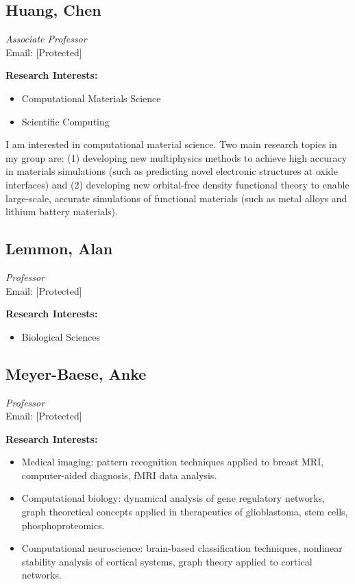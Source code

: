\documentclass[12pt,a4paper]{article}
\begin{document}
\subsection{Huang, Chen}
\textit{Associate Professor} \\
Email: [Protected]

\textbf{Research Interests:}
\begin{itemize}
    \item Computational Materials Science
    \item Scientific Computing
\end{itemize}

I am interested in computational material science. Two main research topics in my group are: (1) developing new multiphysics methods to achieve high accuracy in materials simulations (such as predicting novel electronic structures at oxide interfaces) and (2) developing new orbital-free density functional theory to enable large-scale, accurate simulations of functional materials (such as metal alloys and lithium battery materials).

\subsection{Lemmon, Alan}
\textit{Professor} \\
Email: [Protected]

\textbf{Research Interests:}
\begin{itemize}
    \item Biological Sciences
\end{itemize}

\subsection{Meyer-Baese, Anke}
\textit{Professor} \\
Email: [Protected]

\textbf{Research Interests:}
\begin{itemize}
    \item Medical imaging: pattern recognition techniques applied to breast MRI, computer-aided diagnosis, fMRI data analysis.
    \item Computational biology: dynamical analysis of gene regulatory networks, graph theoretical concepts applied in therapeutics of glioblastoma, stem cells, phosphoproteomics.
    \item Computational neuroscience: brain-based classification techniques, nonlinear stability analysis of cortical systems, graph theory applied to cortical networks.
\end{itemize}
\end{document}
